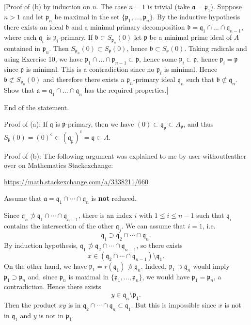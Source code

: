 \documentclass[parskip=half,fontsize=12pt]{scrartcl}%
\newcommand{\oo}{\operatorname}\newcommand{\ooo}{\operatorname*}
\newcommand{\mf}{\mathfrak}
\newcommand{\ppp}{\mf p}
\newcommand{\qqq}{\mf q}
\begin{document}
[Proof of (b) by induction on $n$. The case $n=1$ is trivial (take $\mathfrak a=\mathfrak p_1$). Suppose $n>1$ and let $\mathfrak p_n$ be maximal in the set $\{\mathfrak p_1,\dots,\mathfrak p_n\}$. By the inductive hypothesis there exists an ideal $\mathfrak b$ and a minimal primary decomposition $\mathfrak b=\mathfrak q_1\cap\dots\cap\mathfrak q_{n-1}$, where each $\mathfrak q_i$ is $\mathfrak p_i$-primary. If $\mathfrak b\subset S_{\mathfrak p_n}(0)$ let $\mathfrak p$ be a minimal prime ideal of $A$ contained in $\mathfrak p_n$. Then $S_{\mathfrak p_n}(0)\subset S_{\mathfrak p}(0)$, hence $\mathfrak b\subset S_{\mathfrak p}(0)$. Taking radicals and using Exercise 10, we have $\mathfrak p_1\cap\dots\cap\mathfrak p_{n-1}\subset\mathfrak p$, hence some $\mathfrak p_i\subset \mathfrak p$, hence $\mathfrak p_i=\mathfrak p$ since $\mathfrak p$ is minimal. This is a contradiction since no $\mathfrak p_i$ is minimal. Hence $\mathfrak b\not\subset S_{\mathfrak p_n}(0)$ and therefore there exists a $\mathfrak p_n$-primary ideal $\mathfrak q_n$ such that $\mathfrak b\not\subset\mathfrak q_n$. Show that $\mathfrak a=\mathfrak q_1\cap\dots\cap\mathfrak q_n$ has the required properties.]

End of the statement.

Proof of (a): If $\qqq$ is $\ppp$-primary, then we have $(0)\subset\qqq_\ppp\subset A_\ppp$, and thus $S_\ppp(0)=(0)^{\oo c}\subset(\qqq_\ppp)^{\oo c}=\qqq\subset A$. 

Proof of (b): The following argument was explained to me by user withoutfeather over on Mathematics Stackexchange: 

\href{https://math.stackexchange.com/a/3338211/660}{https://math.stackexchange.com/a/3338211/660}

Assume that $\mathfrak{a}=\mathfrak{q}_1\cap\cdots\cap\mathfrak{q}_n$ is \textbf{not} reduced. %

Since $\mathfrak{q}_n\not\supset\mathfrak{q}_1\cap\cdots\cap\mathfrak{q}_{n-1}$, there is an index $i$ with $1\leq i\leq n-1$ such that $\mathfrak{q}_i$ contains the intersection of the other $\qqq_j$. We can assume that $i=1$, i.e. 
$$
\mathfrak{q}_1\supset\mathfrak{q}_2\cap\cdots\cap\mathfrak{q}_n.
$$ 
By induction hypothesis, $\mathfrak{q}_1\not\supset\mathfrak{q}_2\cap\cdots\cap\mathfrak{q}_{n-1}$, so there exists 
$$
x\in(\mathfrak{q}_2\cap\cdots\cap\mathfrak{q}_{n-1})\setminus\mathfrak{q}_1.
$$ 
On the other hand, we have $\mathfrak{p}_1=r(\mathfrak{q}_1)\not \supset \mathfrak{q}_n$. Indeed, $\mathfrak{p}_1\supset \mathfrak{q}_n$ would imply $\mathfrak{p}_1\supset \mathfrak{p}_n$ and, since $\mathfrak{p}_n$ is maximal in $\{\mathfrak{p}_1,\dots,\mathfrak{p}_n\}$, we would have $\mathfrak{p}_1=\mathfrak{p}_n$, a contradiction. Hence there exists 
$$
y\in\mathfrak{q}_n\setminus\mathfrak{p}_1.
$$ 
Then the product $xy$ is in $\mathfrak{q}_2\cap\cdots\cap\mathfrak{q}_n\subset\mathfrak{q}_1$. But this is impossible since $x$ is not in $\qqq_1$ and $y$ is not in $\ppp_1$. %
\end{document}
